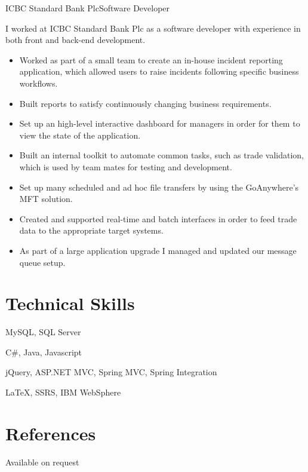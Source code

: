 \documentclass[10pt,a4paper]{moderncv}
\begin{document}
        {ICBC Standard Bank Plc}{Software Developer}{}{}
        {
        I worked at ICBC Standard Bank Plc as a software developer with experience in both front and back-end development.
        \begin{itemize}
            \item Worked as part of a small team to create an in-house incident reporting application, which allowed users to raise incidents following specific business workflows.
            \item Built reports to satisfy continuously changing business requirements.
            \item Set up an high-level interactive dashboard for managers in order for them to view the state of the application.
            \item Built an internal toolkit to automate common tasks, such as trade validation, which is used by team mates for testing and development.
            \item Set up many scheduled and ad hoc file transfers by using the GoAnywhere's MFT solution.
            \item Created and supported real-time and batch interfaces in order to feed trade data to the appropriate target systems.
            \item As part of a large application upgrade I managed and updated our message queue setup.
        \end{itemize}
        }
    
    
    
    
        \section{Technical Skills}
        {MySQL, SQL Server}
        {}
        {}
    
        {C\#, Java, Javascript}
        {}
        {}
    
        {jQuery, ASP.NET MVC, Spring MVC, Spring Integration}
        {}
        {}
    
        {LaTeX, SSRS, IBM WebSphere}
        {}
        {}
    
        \section{References}
        \qquad \qquad \qquad \quad Available on request
    
    
\end{document}
